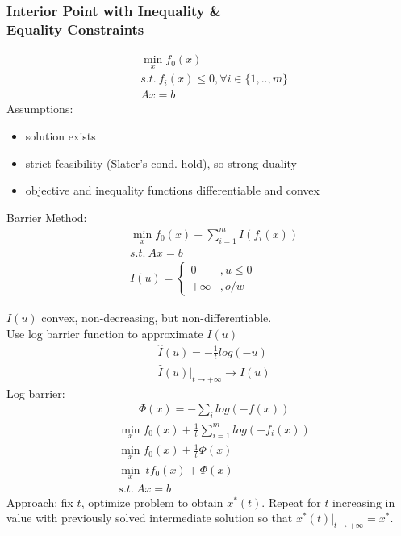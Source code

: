 \documentclass[8pt]{report}
\newcommand{\set}[1]{\{#1\}}
\begin{document}
\begin{multicols*}{2}
  \subsubsection{Interior Point with Inequality \&\\ Equality Constraints}
  \begin{align*}
    &\min_x f_0(x)\\
    &s.t.\ f_i(x) \leq 0, \forall i\in\set{1,..,m}\\
    & Ax = b
  \end{align*}
  Assumptions:
  \begin{itemize}
  \item solution exists
  \item strict feasibility (Slater's cond. hold), so strong duality
  \item objective and inequality functions differentiable and convex
  \end{itemize}

  Barrier Method:
  \begin{align*}
    &\min_x f_0(x) + \sum_{i=1}^m I(f_i(x))\\
    &s.t.\ Ax = b\\
    &I(u) =
      \begin{cases}
        0 &, u \leq 0\\
        +\infty &, o/w
      \end{cases}
  \end{align*}

  \vfill\null
  \columnbreak
  
  $I(u)$ convex, non-decreasing, but non-differentiable.\\
  
  Use log barrier function to approximate $I(u)$
  \begin{align*}
    &\hat{I}(u) = -\frac{1}{t}log(-u)\\
    &\hat{I}(u)|_{t \to +\infty} \to I(u)
  \end{align*}
  Log barrier:
  \begin{align*}
    &\Phi(x) = -\sum_i log(-f(x))
  \end{align*}
  \begin{align*}
    &\min_x f_0(x) + \frac{1}{t} \sum_{i=1}^m log(-f_i(x))\\
    &\min_x f_0(x) + \frac{1}{t} \Phi(x)\\
    &\min_x\ t f_0(x) + \Phi(x)\\
    &s.t.\ Ax = b
  \end{align*}
  Approach: fix $t$, optimize problem to obtain $x^*(t)$. Repeat for $t$ increasing in value with previously solved intermediate solution so that $x^*(t)|_{t\to +\infty} = x^*$.\\


\end{multicols*}
\end{document}
